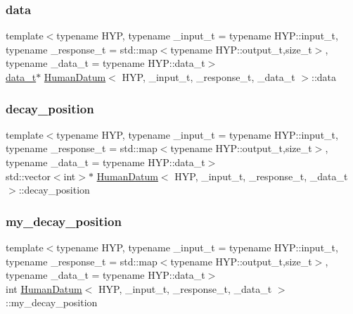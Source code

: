 \mbox{\label{struct_human_datum_a0b071376a3ff5baf723017393149182d}} 
\subsubsection{\texorpdfstring{data}{data}}
{\footnotesize\ttfamily template$<$typename H\+YP, typename \+\_\+input\+\_\+t = typename H\+Y\+P\+::input\+\_\+t, typename \+\_\+response\+\_\+t = std\+::map$<$typename H\+Y\+P\+::output\+\_\+t,size\+\_\+t$>$, typename \+\_\+data\+\_\+t = typename H\+Y\+P\+::data\+\_\+t$>$ \\
\hyperlink{struct_human_datum_ab199049ab924515f05cf207d380bb851}{data\+\_\+t}$\ast$ \hyperlink{struct_human_datum}{Human\+Datum}$<$ H\+YP, \+\_\+input\+\_\+t, \+\_\+response\+\_\+t, \+\_\+data\+\_\+t $>$\+::data}

\mbox{\label{struct_human_datum_a34b8290e9ec504669cd18bad96419e83}} 
\subsubsection{\texorpdfstring{decay\+\_\+position}{decay\_position}}
{\footnotesize\ttfamily template$<$typename H\+YP, typename \+\_\+input\+\_\+t = typename H\+Y\+P\+::input\+\_\+t, typename \+\_\+response\+\_\+t = std\+::map$<$typename H\+Y\+P\+::output\+\_\+t,size\+\_\+t$>$, typename \+\_\+data\+\_\+t = typename H\+Y\+P\+::data\+\_\+t$>$ \\
std\+::vector$<$int$>$$\ast$ \hyperlink{struct_human_datum}{Human\+Datum}$<$ H\+YP, \+\_\+input\+\_\+t, \+\_\+response\+\_\+t, \+\_\+data\+\_\+t $>$\+::decay\+\_\+position}

\mbox{\label{struct_human_datum_af3825f4fb10987c0dd68063ba3613069}} 
\subsubsection{\texorpdfstring{my\+\_\+decay\+\_\+position}{my\_decay\_position}}
{\footnotesize\ttfamily template$<$typename H\+YP, typename \+\_\+input\+\_\+t = typename H\+Y\+P\+::input\+\_\+t, typename \+\_\+response\+\_\+t = std\+::map$<$typename H\+Y\+P\+::output\+\_\+t,size\+\_\+t$>$, typename \+\_\+data\+\_\+t = typename H\+Y\+P\+::data\+\_\+t$>$ \\
int \hyperlink{struct_human_datum}{Human\+Datum}$<$ H\+YP, \+\_\+input\+\_\+t, \+\_\+response\+\_\+t, \+\_\+data\+\_\+t $>$\+::my\+\_\+decay\+\_\+position}

